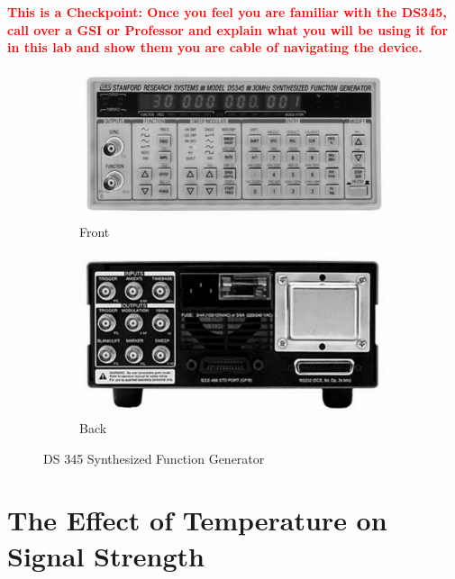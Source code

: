 \documentclass{../lab}
\begin{document}
\noindent\textbf{\textcolor{red}{This is a Checkpoint: Once you feel you are familiar with the DS345, call over a GSI or Professor and explain what you will be using it for in this lab and show them you are cable of navigating the device.}}

\begin{figure}[ht]
    \begin{subfigure}[b]{0.5\linewidth}
        \centering
        \includegraphics[width=\linewidth]{images/DS345front}
        \caption{Front}
        \label{fig:DS345front}
    \end{subfigure}
    \begin{subfigure}[b]{0.5\linewidth}
        \centering
        \includegraphics[width=\linewidth]{images/DS345back}
        \caption{Back}
        \label{fig:DS345back}
    \end{subfigure}
    \caption{DS 345 Synthesized Function Generator}\label{fig:DS345}
\end{figure}

\section{The Effect of Temperature on Signal Strength}
\end{document}
